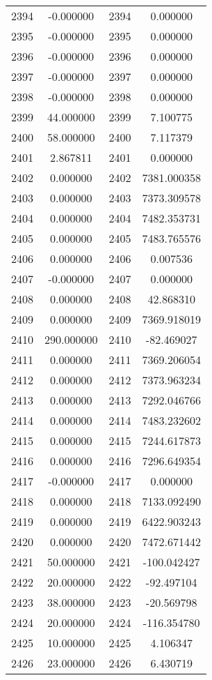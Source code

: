 \documentclass[12pt]{article}
\begin{document}
\begin{longtable}{@{}cccc@{}}
2394 & -0.000000 & 2394 & 0.000000 \\
2395 & -0.000000 & 2395 & 0.000000 \\
2396 & -0.000000 & 2396 & 0.000000 \\
2397 & -0.000000 & 2397 & 0.000000 \\
2398 & -0.000000 & 2398 & 0.000000 \\
2399 & 44.000000 & 2399 & 7.100775 \\
2400 & 58.000000 & 2400 & 7.117379 \\
2401 & 2.867811 & 2401 & 0.000000 \\
2402 & 0.000000 & 2402 & 7381.000358 \\
2403 & 0.000000 & 2403 & 7373.309578 \\
2404 & 0.000000 & 2404 & 7482.353731 \\
2405 & 0.000000 & 2405 & 7483.765576 \\
2406 & 0.000000 & 2406 & 0.007536 \\
2407 & -0.000000 & 2407 & 0.000000 \\
2408 & 0.000000 & 2408 & 42.868310 \\
2409 & 0.000000 & 2409 & 7369.918019 \\
2410 & 290.000000 & 2410 & -82.469027 \\
2411 & 0.000000 & 2411 & 7369.206054 \\
2412 & 0.000000 & 2412 & 7373.963234 \\
2413 & 0.000000 & 2413 & 7292.046766 \\
2414 & 0.000000 & 2414 & 7483.232602 \\
2415 & 0.000000 & 2415 & 7244.617873 \\
2416 & 0.000000 & 2416 & 7296.649354 \\
2417 & -0.000000 & 2417 & 0.000000 \\
2418 & 0.000000 & 2418 & 7133.092490 \\
2419 & 0.000000 & 2419 & 6422.903243 \\
2420 & 0.000000 & 2420 & 7472.671442 \\
2421 & 50.000000 & 2421 & -100.042427 \\
2422 & 20.000000 & 2422 & -92.497104 \\
2423 & 38.000000 & 2423 & -20.569798 \\
2424 & 20.000000 & 2424 & -116.354780 \\
2425 & 10.000000 & 2425 & 4.106347 \\
2426 & 23.000000 & 2426 & 6.430719 \\

\end{longtable}
\end{document}

